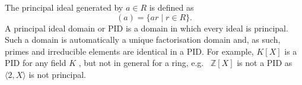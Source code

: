  The  principal ideal generated by  $ a \in R $  is defined as
 \[(a)= \{ar \mid r \in R \}. \]  A  principal ideal domain or  PID
is a domain in which every ideal is principal. Such a domain is
automatically a unique factorisation domain and, as such,
primes and irreducible elements are identical
in a PID. For example,  $ K[X] $  is a PID for any field  $ K $ , but
not in general for a ring, e.g. \  $  \mathbb{Z}[X] $  is not a PID as
 $  \langle 2,X \rangle $  is not principal.


